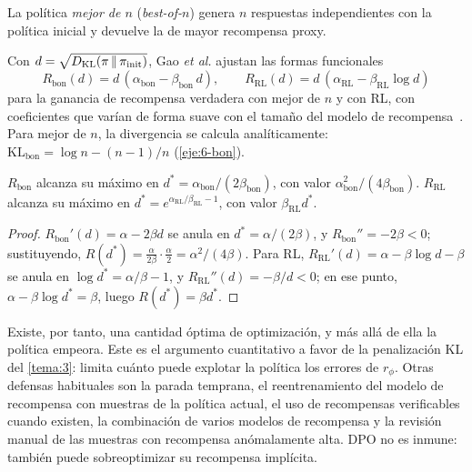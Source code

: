 \begin{definicion}[Mejor de $n$]\label{def:bon}
La política \emph{mejor de $n$} (\emph{best-of-$n$}) genera $n$ respuestas independientes con la política inicial y devuelve la de mayor recompensa proxy.
\end{definicion}

Con $d=\sqrt{D_{\mathrm{KL}}(\pi\,\|\,\pi_{\mathrm{init}})}$, Gao \emph{et al.} ajustan las formas funcionales
\[
R_{\mathrm{bon}}(d)=d\,(\alpha_{\mathrm{bon}}-\beta_{\mathrm{bon}}\,d),\qquad R_{\mathrm{RL}}(d)=d\,(\alpha_{\mathrm{RL}}-\beta_{\mathrm{RL}}\log d)
\]
para la ganancia de recompensa verdadera con mejor de $n$ y con RL, con coeficientes que varían de forma suave con el tamaño del modelo de recompensa~\cite{gao}. Para mejor de $n$, la divergencia se calcula analíticamente: $\mathrm{KL}_{\mathrm{bon}}=\log n-(n-1)/n$ (\cref{eje:6-bon}).

\begin{proposicion}\label{prop:gao}
$R_{\mathrm{bon}}$ alcanza su máximo en $d^{*}=\alpha_{\mathrm{bon}}/(2\beta_{\mathrm{bon}})$, con valor $\alpha_{\mathrm{bon}}^{2}/(4\beta_{\mathrm{bon}})$. $R_{\mathrm{RL}}$ alcanza su máximo en $d^{*}=e^{\alpha_{\mathrm{RL}}/\beta_{\mathrm{RL}}-1}$, con valor $\beta_{\mathrm{RL}}d^{*}$.
\end{proposicion}

\begin{proof}
$R_{\mathrm{bon}}'(d)=\alpha-2\beta d$ se anula en $d^{*}=\alpha/(2\beta)$, y $R_{\mathrm{bon}}''=-2\beta<0$; sustituyendo, $R(d^{*})=\frac{\alpha}{2\beta}\cdot\frac{\alpha}{2}=\alpha^{2}/(4\beta)$. Para RL, $R_{\mathrm{RL}}'(d)=\alpha-\beta\log d-\beta$ se anula en $\log d^{*}=\alpha/\beta-1$, y $R_{\mathrm{RL}}''(d)=-\beta/d<0$; en ese punto, $\alpha-\beta\log d^{*}=\beta$, luego $R(d^{*})=\beta d^{*}$.
\end{proof}

Existe, por tanto, una cantidad óptima de optimización, y más allá de ella la política empeora. Este es el argumento cuantitativo a favor de la penalización KL del \cref{tema:3}: limita cuánto puede explotar la política los errores de $r_\phi$. Otras defensas habituales son la parada temprana, el reentrenamiento del modelo de recompensa con muestras de la política actual, el uso de recompensas verificables cuando existen, la combinación de varios modelos de recompensa y la revisión manual de las muestras con recompensa anómalamente alta. DPO no es inmune: también puede sobreoptimizar su recompensa implícita.

